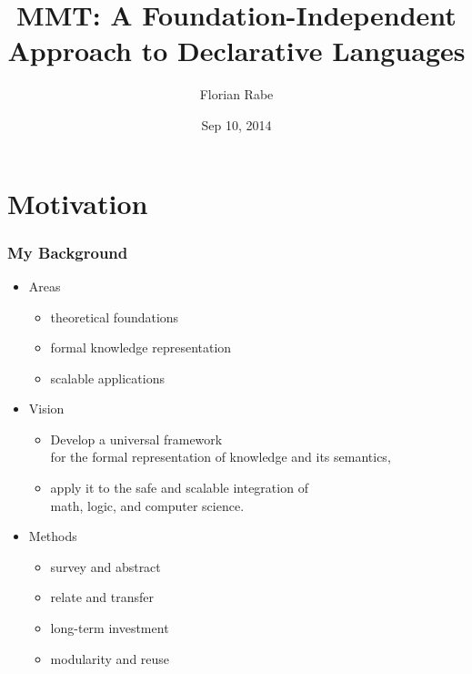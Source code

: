 \documentclass{beamer}
\begin{document}
\title{MMT: A Foundation-Independent Approach to Declarative Languages}
\author{Florian Rabe}
\date{Sep 10, 2014}
\begin{frame}
    \titlepage
\end{frame}

\section{Motivation}

\begin{frame}\frametitle{My Background}
\begin{itemize}
\item Areas
  \begin{itemize}
   \item theoretical foundations
   \item formal knowledge representation
   \item scalable applications
  \end{itemize}
\item Vision
  \begin{itemize}
   \item Develop a universal framework \\
         for the formal representation of knowledge and its semantics,
   \item apply it to the safe and scalable integration of \\
         math, logic, and computer science.
  \end{itemize}
\item Methods
	\begin{itemize}
	 \item survey and abstract
	 \item relate and transfer
	 \item long-term investment
	 \item modularity and reuse
	\end{itemize}
\end{itemize}
\end{frame}
\end{document}
